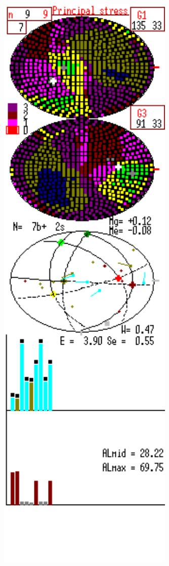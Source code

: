 \begin{figure}[H]
\begin{changemargin}{0cm}{0cm}
\begin{center}
\begin{minipage}[h]{0.34\linewidth}
\begin{center}
              \includegraphics[width=0.75\textwidth]{authors/kondratev-fig3.png}
      \end{center}


\end{minipage}
\end{center}
\end{changemargin}
\end{figure}
